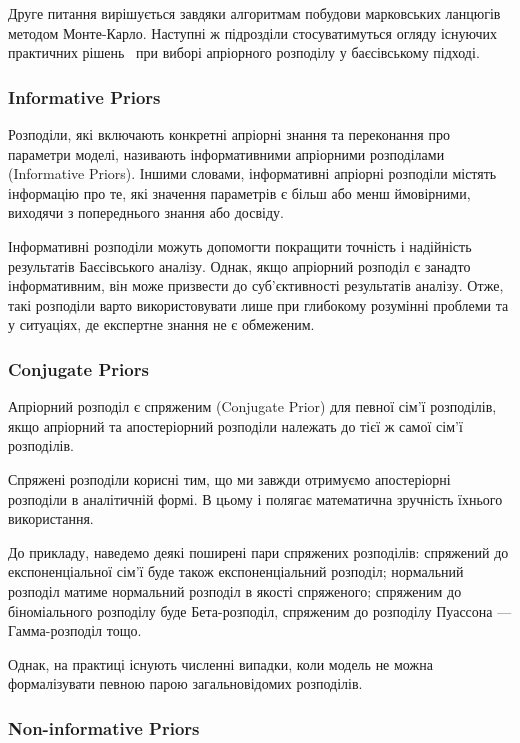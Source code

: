 Друге питання вирішується завдяки алгоритмам побудови марковських ланцюгів методом Монте-Карло. Наступні ж підрозділи стосуватимуться огляду існуючих практичних рішень~\cite{Robert2011} при виборі апріорного розподілу у баєсівському підході.

\subsubsection*{Informative Priors}

Розподіли, які включають конкретні апріорні знання та переконання про параметри моделі, називають інформативними апріорними розподілами (Informative Priors). Іншими словами, інформативні апріорні розподіли містять інформацію про те, які значення параметрів є більш або менш ймовірними, виходячи з попереднього знання або досвіду. 

Інформативні розподіли можуть допомогти покращити точність і надійність результатів Баєсівського аналізу. Однак, якщо апріорний розподіл є занадто інформативним, він може призвести до суб'єктивності результатів аналізу. Отже, такі розподіли варто використовувати лише при глибокому розумінні проблеми та у ситуаціях, де експертне знання не є обмеженим.

\subsubsection*{Conjugate Priors}

Апріорний розподіл є спряженим (Conjugate Prior) для певної сім'ї розподілів, якщо апріорний та апостеріорний розподіли належать до тієї ж самої сім’ї розподілів.

Спряжені розподіли корисні тим, що ми завжди отримуємо апостеріорні розподіли в аналітичній формі. В цьому і полягає математична зручність їхнього використання.

До прикладу, наведемо деякі поширені пари спряжених розподілів: спряжений до експоненціальної сім'ї буде також експоненціальний розподіл; нормальний розподіл матиме нормальний розподіл в якості спряженого;  спряженим до біноміального розподілу буде Бета-розподіл, спряженим до розподілу Пуассона --- Гамма-розподіл тощо.

Однак, на практиці існують численні випадки, коли модель не можна формалізувати певною парою загальновідомих розподілів.

\subsubsection*{Non-informative Priors}

